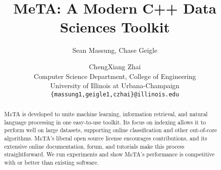 \documentclass[11pt]{article}
\title{MeTA: A Modern C++ Data Sciences Toolkit} %
\author{Sean Massung, Chase Geigle \and ChengXiang Zhai \\
            Computer Science Department, College of Engineering \\
            University of Illinois at Urbana-Champaign \\
            {\tt \{massung1,geigle1,czhai\}@illinois.edu}
}
\date{}
\def\meta/{\textsc{MeTA}}
\begin{document}
\maketitle

\begin{abstract}
\meta/ is developed to unite machine learning, information retrieval, and
natural language processing in one easy-to-use toolkit. Its focus on
indexing allows it to perform well on large datasets, supporting online
classification and other out-of-core algorithms. \meta/'s liberal open
source license encourages contributions, and its extensive online
documentation, forum, and tutorials make this process straightforward. We
run experiments and show \meta/'s performance is competitive with or better
than existing software.
\end{abstract}






\small


\normalsize
\end{document}

